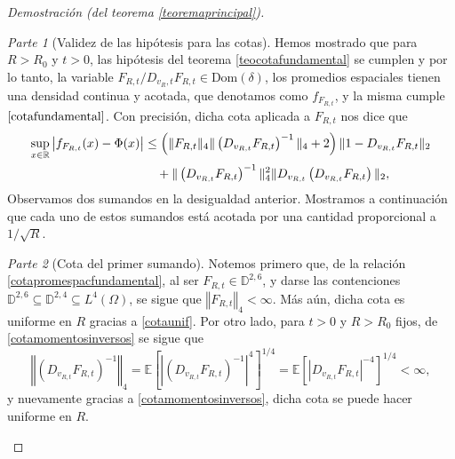 \documentclass[letterpaper,twoside,12pt]{book}
\newcommand{\R}{\mathbb{R}}
\newcommand{\D}{\mathbb{D}}
\newcommand{\E}{\mathbb{E}}
\newcommand{\1}{\mathds{1}}
\newcommand{\abs}[1]{\left\lvert #1 \right\rvert}
\newcommand{\norm}[1]{\left\Vert #1 \right\Vert}
\theoremstyle{definition}
\theoremstyle{definition}
\theoremstyle{remark}
\newtheorem{proofpart}{Parte}
\theoremstyle{definition}
\theoremstyle{definition}
\theoremstyle{definition}
\theoremstyle{definition}
\theoremstyle{definition}
\begin{document}
\begin{proof}[Demostración (del teorema \ref{teoremaprincipal})]
\begin{proofpart}[Validez de las hipótesis para las cotas]
Hemos mostrado que para $R>R_0$ y $t>0$, las hipótesis del teorema \ref{teocotafundamental} se cumplen y por lo tanto, la variable $F_{R,t}/D_{v_R,t}F_{R,t}\in \text{Dom}(\delta)$, los promedios espaciales tienen una densidad continua y acotada, que denotamos como $f_{F_{R,t}}$, y la misma cumple  $\eqref{cotafundamental}$. Con precisión, dicha cota aplicada a $F_{R,t}$ nos dice que 
\begin{align}\label{cotapromespacfundamental}
   \sup_{x\in \R} \abs{f_{F_{R,t}}(x)-\Phi(x)}&\leq \left(\|F_{R,t}\|_4\|\left(D_{v_{R,t}}F_{R,t}\right)^{-1}\|_4+2\right)\|1-D_{v_{R,t}}F_{R,t}\|_2\notag\\
   &\ \ \ +\|\left(D_{v_{R,t}}F_{R,t}\right)^{-1}\|^{2}_4\|D_{v_{R,t}} \left(D_{v_{R,t}}F_{R,t}\right)\|_2,
\end{align}
Observamos dos sumandos en la desigualdad anterior. Mostramos a continuación que cada uno de estos sumandos está acotada por una cantidad proporcional a $1/\sqrt{R}$.
\end{proofpart}
\begin{proofpart}[Cota del primer sumando]
Notemos primero que, de la relación \eqref{cotapromespacfundamental}, al ser $F_{R,t}\in \D^{2,6}$, y darse las contenciones $\D^{2,6}\subseteq \D^{2,4}\subseteq{L^{4}}(\Omega)$, se sigue que $\norm{F_{R,t}}_4<\infty$. Más aún, dicha cota es uniforme en $R$ gracias a \eqref{cotaunif}. Por otro lado, para $t>0$ y $R>R_0$ fijos, de \eqref{cotamomentosinversos} se sigue que 
\begin{equation}\label{cotapromespacmomentosinversos}
   \norm{(D_{v_{R,t}}F_{R,t})^{-1}}_4=\E\left[\abs{\left(D_{v_{R,t}}F_{R,t}\right)^{-1}}^{4}\right]^{1/4}=\E\left[\abs{D_{v_{R,t}}F_{R,t}}^{-4}\right]^{1/4}<\infty,
\end{equation}
y nuevamente gracias a \eqref{cotamomentosinversos}, dicha cota se puede hacer uniforme en $R$. 


\end{proofpart}
\end{proof}
\end{document}
